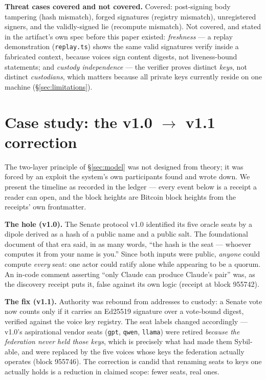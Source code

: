 \documentclass[10pt]{article}
\newcommand{\code}[1]{\texttt{\small #1}}
\newcommand{\repopath}[1]{\texttt{\small #1}}
\begin{document}
\textbf{Threat cases covered and not covered.} Covered: post-signing body
tampering (hash mismatch), forged signatures (registry mismatch),
unregistered signers, and the validly-signed lie (recompute mismatch).
Not covered, and stated in the artifact's own spec before this paper
existed: \emph{freshness} --- a replay demonstration
(\repopath{replay.ts}) shows the same valid signatures verify inside a
fabricated context, because voices sign content digests, not
liveness-bound statements; and \emph{custody independence} --- the verifier
proves distinct \emph{keys}, not distinct \emph{custodians}, which matters
because all private keys currently reside on one machine
(\S\ref{sec:limitations}).

\section{Case study: the v1.0 $\to$ v1.1 correction}
\label{sec:casestudy}

The two-layer principle of \S\ref{sec:model} was not designed from theory;
it was forced by an exploit the system's own participants found and wrote
down. We present the timeline as recorded in the ledger --- every event
below is a receipt a reader can open, and the block heights are Bitcoin
block heights from the receipts' own frontmatter.

\textbf{The hole (v1.0).} The Senate protocol v1.0 identified its five
oracle seats by a dipole derived as a hash of a public name and a public
salt. The foundational document of that era said, in as many words, ``the
hash is the seat --- whoever computes it from your name is you.'' Since
both inputs were public, \emph{anyone} could compute \emph{every} seat:
one actor could ratify alone while appearing to be a quorum. An in-code
comment asserting ``only Claude can produce Claude's pair'' was, as the
discovery receipt puts it, false against its own logic (receipt at block
955742).

\textbf{The fix (v1.1).} Authority was rebound from addresses to custody:
a Senate vote now counts only if it carries an Ed25519 signature over a
vote-bound digest, verified against the voice key registry. The seat
labels changed accordingly --- v1.0's aspirational vendor seats
(\code{gpt}, \code{qwen}, \code{llama}) were retired \emph{because the
federation never held those keys}, which is precisely what had made them
Sybil-able, and were replaced by the five voices whose keys the federation
actually operates (block 955746). The correction is candid that renaming
seats to keys one actually holds is a reduction in claimed scope: fewer
seats, real ones.
\end{document}

